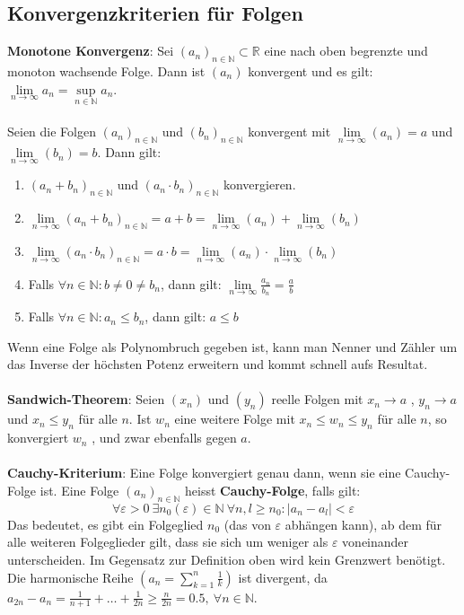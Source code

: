 \documentclass[a4paper,10pt]{scrartcl}
\newcommand{\limi}{\lim\limits_{n\rightarrow \infty}}
\begin{document}
\subsection{Konvergenzkriterien für Folgen}
\textbf{Monotone Konvergenz}: Sei $(a_n)_{n\in\mathbb{N}}\subset \mathbb{R}$ eine nach oben begrenzte und monoton wachsende Folge. Dann ist $(a_n)$ konvergent und es gilt: $\limi a_n = \sup\limits_{n\in\mathbb{N}} a_n$. \\\\
Seien die Folgen $(a_n)_{n\in\mathbb{N}}$ und $(b_n)_{n\in\mathbb{N}}$ konvergent mit $\limi (a_n)= a$ und $\limi (b_n)=b$. Dann gilt: 
\begin{enumerate}[label=$\circ$]
	\item $(a_n+b_n)_{n\in\mathbb{N}}$ und $(a_n\cdot b_n)_{n\in\mathbb{N}}$ konvergieren. 
	\item $\limi (a_n+b_n)_{n\in\mathbb{N}} = a+b = \limi (a_n) + \limi (b_n)$
	\item $\limi (a_n\cdot b_n)_{n\in\mathbb{N}} = a\cdot b = \limi (a_n) \cdot \limi (b_n)$
	\item Falls $\forall n\in \mathbb{N}: b\neq 0 \neq b_n$, dann gilt: $\limi \frac{a_n}{b_n} = \frac{a}{b}$
	\item Falls $\forall n\in \mathbb{N}: a_n \leq b_n$, dann gilt: $a\leq b$
\end{enumerate}
Wenn eine Folge als Polynombruch gegeben ist, kann man Nenner und Zähler um das Inverse der höchsten Potenz erweitern und kommt schnell aufs Resultat. \\\\
\textbf{Sandwich-Theorem}: Seien $(x_n)$ und $(y_n)$ reelle Folgen mit $x_{n}\rightarrow a$ , $y_{n}\rightarrow a$  und $ x_{n}\leq y_{n}$  für alle $n$. Ist $w_{n}$  eine weitere Folge mit $x_{n}\leq w_{n}\leq y_{n}$  für alle $n$, so konvergiert $w_{n}$ , und zwar ebenfalls gegen $a$.\\\\
\textbf{Cauchy-Kriterium}: Eine Folge konvergiert genau dann, wenn sie eine Cauchy-Folge ist. Eine Folge $(a_n)_{n\in\mathbb{N}}$ heisst \textbf{Cauchy-Folge}, falls gilt: 
\begin{equation*}
	\forall \varepsilon>0\ \exists n_0(\varepsilon) \in \mathbb{N} \ \forall n,l \geq n_0 : |a_n-a_l|<\varepsilon
\end{equation*}
Das bedeutet, es gibt ein Folgeglied $n_0$ (das von $\varepsilon$ abhängen kann), ab dem für alle weiteren Folgeglieder gilt, dass sie sich um weniger als $\varepsilon$ voneinander unterscheiden. Im Gegensatz zur Definition oben wird kein Grenzwert benötigt. Die harmonische Reihe $\left(a_n = \sum_{k=1}^{n} \frac{1}{k}\right)$ ist divergent, da $a_{2n}-a_n=\frac{1}{n+1}+\dots+\frac{1}{2n} \geq \frac{n}{2n}= 0.5, \ \forall n\in\mathbb{N}$. 
\end{document}
